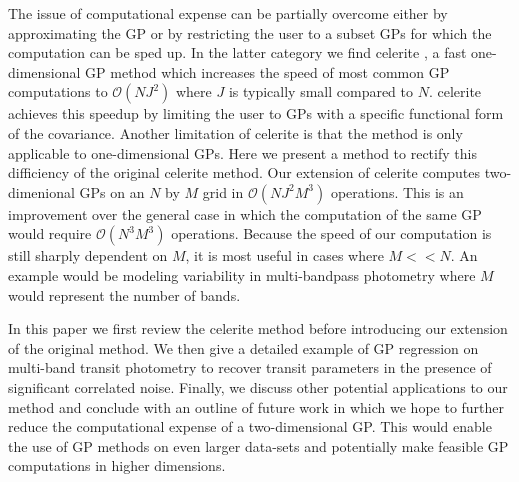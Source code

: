 \documentclass[preprint2]{aastex62}
\newcommand{\project}[1]{\textsf{#1}}
\newcommand{\celerite}{\project{celerite }}
\begin{document}
    The issue of computational expense can be partially overcome either by approximating 
    the GP or by restricting the user to a subset GPs for which the computation 
    can be sped up\citep{Rasmussen2006}. In the latter category we 
    find \celerite\citep{Foreman-Mackey2017}, a fast one-dimensional GP 
    method which increases the speed of most common GP computations to $\mathcal{O}(NJ^2)$ 
    where $J$ is typically small compared to $N$. \celerite achieves this speedup by 
    limiting the user to GPs with a specific functional form of the covariance. 
    Another limitation of \celerite is that the method is only applicable to 
    one-dimensional GPs. Here we present a method to rectify this difficiency of 
    the original \celerite method. Our extension of \celerite computes two-dimenional 
    GPs on an $N$ by $M$ grid in $\mathcal{O}(NJ^2M^3)$ operations. This is an improvement 
    over the general case in which the computation of the same GP would require $\mathcal{O}(N^3M^3)$ 
    operations. Because the speed of our computation is still sharply dependent on $M$, it 
    is most useful in cases where $M << N$. An example would be modeling variability in 
    multi-bandpass photometry where $M$ would represent the number of bands. 

    In this paper we first review the \celerite method before introducing our extension 
    of the original method. We then give a detailed example of GP regression on multi-band 
    transit photometry to recover transit parameters in the presence of significant 
    correlated noise. Finally, we discuss other potential applications to our method and 
    conclude with an outline of future work in which we hope to further reduce the 
    computational expense of a two-dimensional GP. This would enable the use of 
    GP methods on even larger data-sets and potentially make feasible GP computations 
    in higher dimensions. 
		
\end{document}
